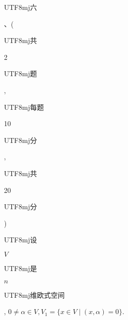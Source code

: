 \documentclass[10pt]{article}
\begin{document}
\begin{CJK}{UTF8}{mj}六\end{CJK}、(\begin{CJK}{UTF8}{mj}共\end{CJK} 2 \begin{CJK}{UTF8}{mj}题\end{CJK}, \begin{CJK}{UTF8}{mj}每题\end{CJK} 10 \begin{CJK}{UTF8}{mj}分\end{CJK}, \begin{CJK}{UTF8}{mj}共\end{CJK} 20 \begin{CJK}{UTF8}{mj}分\end{CJK}) \begin{CJK}{UTF8}{mj}设\end{CJK} $V$ \begin{CJK}{UTF8}{mj}是\end{CJK} $n$ \begin{CJK}{UTF8}{mj}维欧式空间\end{CJK}, $0 \neq \alpha \in V, V_{1}=\{x \in V \mid(x, \alpha)=0\}$.
\end{document}
